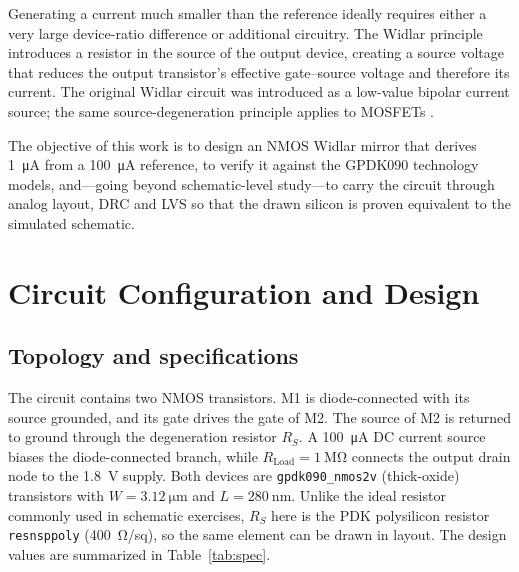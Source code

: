 \documentclass[conference]{IEEEtran}
\begin{document}
Generating a current much smaller than the reference ideally requires either
a very large device-ratio difference or additional circuitry. The Widlar
principle introduces a resistor in the source of the output device, creating
a source voltage that reduces the output transistor's effective gate--source
voltage and therefore its current. The original Widlar circuit was introduced
as a low-value bipolar current source; the same source-degeneration principle
applies to MOSFETs \cite{widlar,gray}.

The objective of this work is to design an NMOS Widlar mirror that derives
\SI{1}{\micro\ampere} from a \SI{100}{\micro\ampere} reference, to verify it
against the GPDK090 technology models, and---going beyond schematic-level
study---to carry the circuit through analog layout, DRC and LVS so that the
drawn silicon is proven equivalent to the simulated schematic.

\section{Circuit Configuration and Design}

\subsection{Topology and specifications}
The circuit contains two NMOS transistors. M1 is diode-connected with its
source grounded, and its gate drives the gate of M2. The source of M2 is
returned to ground through the degeneration resistor $R_S$. A
\SI{100}{\micro\ampere} DC current source biases the diode-connected branch,
while $R_\mathrm{Load}=\SI{1}{\mega\ohm}$ connects the output drain node to
the \SI{1.8}{\volt} supply. Both devices are \texttt{gpdk090\_nmos2v}
(thick-oxide) transistors with $W=\SI{3.12}{\micro\metre}$ and
$L=\SI{280}{\nano\metre}$. Unlike the ideal resistor commonly used in
schematic exercises, $R_S$ here is the PDK polysilicon resistor
\texttt{resnsppoly} (\SI{400}{\ohm}/sq), so the same element can be drawn in
layout. The design values are summarized in Table~\ref{tab:spec}.
\end{document}
